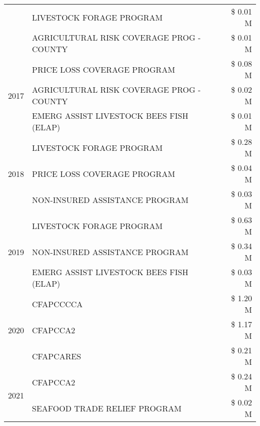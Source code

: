\begin{tabular}{llr}
 & LIVESTOCK FORAGE PROGRAM                      & \$ 0.01 M \\
 & AGRICULTURAL RISK COVERAGE PROG - COUNTY      & \$ 0.01 M \\
\cline{1-3}
\multirow[t]{3}{*}{2017} & PRICE LOSS COVERAGE PROGRAM & \$ 0.08 M \\
 & AGRICULTURAL RISK COVERAGE PROG - COUNTY & \$ 0.02 M \\
 & EMERG ASSIST LIVESTOCK BEES FISH (ELAP) & \$ 0.01 M \\
\cline{1-3}
\multirow[t]{3}{*}{2018} & LIVESTOCK FORAGE PROGRAM & \$ 0.28 M \\
 & PRICE LOSS COVERAGE PROGRAM & \$ 0.04 M \\
 & NON-INSURED ASSISTANCE PROGRAM & \$ 0.03 M \\
\cline{1-3}
\multirow[t]{3}{*}{2019} & LIVESTOCK FORAGE PROGRAM & \$ 0.63 M \\
 & NON-INSURED ASSISTANCE PROGRAM & \$ 0.34 M \\
 & EMERG ASSIST LIVESTOCK BEES FISH (ELAP) & \$ 0.03 M \\
\cline{1-3}
\multirow[t]{3}{*}{2020} & CFAPCCCCA & \$ 1.20 M \\
 & CFAPCCA2 & \$ 1.17 M \\
 & CFAPCARES & \$ 0.21 M \\
\cline{1-3}
\multirow[t]{2}{*}{2021} & CFAPCCA2 & \$ 0.24 M \\
 & SEAFOOD TRADE RELIEF PROGRAM & \$ 0.02 M \\
\cline{1-3}
\bottomrule
\end{tabular}
